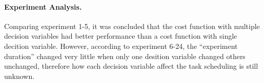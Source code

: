 \paragraph{Experiment Analysis.} 
Comparing experiment 1-5, it was concluded that the cost function with multiple decision variables had better performance than a cost function with single decition variable. However, according to experiment 6-24, the ``experiment duration'' changed very little when only one desition variable changed others unchanged, therefore how each decision variable affect the task scheduling is still unknown.

\begin{table}[htb]
\centering
{}
\caption{Runing execute task with single decision variable and multiple decision variables}
\label{tab:exp_decision_variables}
\end{table}

